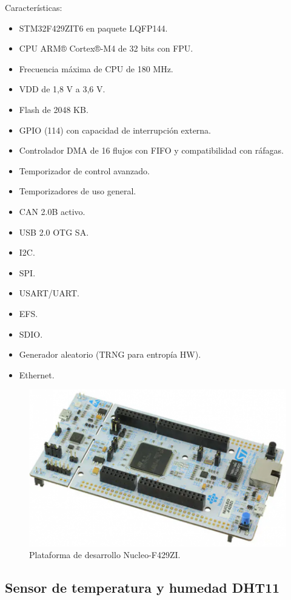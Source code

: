 Características:
\begin{itemize}
\item STM32F429ZIT6 en paquete LQFP144.
\item CPU ARM® Cortex®-M4 de 32 bits con FPU.
\item Frecuencia máxima de CPU de 180 MHz.
\item VDD de 1,8 V a 3,6 V.
\item Flash de 2048 KB.
\item GPIO (114) con capacidad de interrupción externa.
\item Controlador DMA de 16 flujos con FIFO y compatibilidad con ráfagas.
\item Temporizador de control avanzado.
\item Temporizadores de uso general.
\item CAN 2.0B activo.
\item USB 2.0 OTG SA.
\item I2C.
\item SPI.
\item USART/UART.
\item EFS.
\item SDIO.
\item Generador aleatorio (TRNG para entropía HW).
\item Ethernet.
\end{itemize}

\begin{figure}[htbp]
	\centering
	\includegraphics[width=.5\textwidth]{./Figures/STM32-F429ZI.png}
	\caption{Plataforma de desarrollo Nucleo-F429ZI\protect\footnotemark.}
	\label{fig:STM32-F429ZI}
\end{figure}


\subsection{Sensor de temperatura y humedad DHT11}
\label{subsec:dht11}

